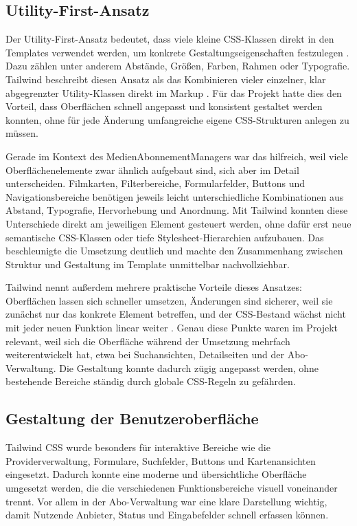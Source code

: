 \subsection{Utility-First-Ansatz}
Der Utility-First-Ansatz bedeutet, dass viele kleine CSS-Klassen direkt in den Templates verwendet werden, um konkrete Gestaltungseigenschaften festzulegen \cite{tailwind_docs,tailwind_utility}. Dazu z\"ahlen unter anderem Abst\"ande, Gr\"o\ss{}en, Farben, Rahmen oder Typografie. Tailwind beschreibt diesen Ansatz als das Kombinieren vieler einzelner, klar abgegrenzter Utility-Klassen direkt im Markup \cite{tailwind_utility}. F\"ur das Projekt hatte dies den Vorteil, dass Oberfl\"achen schnell angepasst und konsistent gestaltet werden konnten, ohne f\"ur jede \"Anderung umfangreiche eigene CSS-Strukturen anlegen zu m\"ussen.

Gerade im Kontext des MedienAbonnementManagers war das hilfreich, weil viele Oberfl\"achenelemente zwar \"ahnlich aufgebaut sind, sich aber im Detail unterscheiden. Filmkarten, Filterbereiche, Formularfelder, Buttons und Navigationsbereiche ben\"otigen jeweils leicht unterschiedliche Kombinationen aus Abstand, Typografie, Hervorhebung und Anordnung. Mit Tailwind konnten diese Unterschiede direkt am jeweiligen Element gesteuert werden, ohne daf\"ur erst neue semantische CSS-Klassen oder tiefe Stylesheet-Hierarchien aufzubauen. Das beschleunigte die Umsetzung deutlich und machte den Zusammenhang zwischen Struktur und Gestaltung im Template unmittelbar nachvollziehbar.

Tailwind nennt au\ss{}erdem mehrere praktische Vorteile dieses Ansatzes: Oberfl\"achen lassen sich schneller umsetzen, \"Anderungen sind sicherer, weil sie zun\"achst nur das konkrete Element betreffen, und der CSS-Bestand w\"achst nicht mit jeder neuen Funktion linear weiter \cite{tailwind_utility}. Genau diese Punkte waren im Projekt relevant, weil sich die Oberfl\"ache w\"ahrend der Umsetzung mehrfach weiterentwickelt hat, etwa bei Suchansichten, Detailseiten und der Abo-Verwaltung. Die Gestaltung konnte dadurch z\"ugig angepasst werden, ohne bestehende Bereiche st\"andig durch globale CSS-Regeln zu gef\"ahrden.

\subsection{Gestaltung der Benutzeroberfl\"ache}
Tailwind CSS wurde besonders f\"ur interaktive Bereiche wie die Providerverwaltung, Formulare, Suchfelder, Buttons und Kartenansichten eingesetzt. Dadurch konnte eine moderne und \"ubersichtliche Oberfl\"ache umgesetzt werden, die die verschiedenen Funktionsbereiche visuell voneinander trennt. Vor allem in der Abo-Verwaltung war eine klare Darstellung wichtig, damit Nutzende Anbieter, Status und Eingabefelder schnell erfassen k\"onnen.

